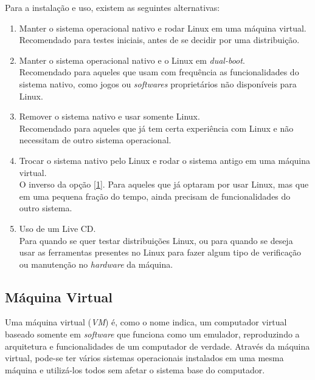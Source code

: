 \documentclass{handout_utfpr}
\begin{document}
Para a instalação e uso, existem as seguintes alternativas:

\begin{enumerate}
\item \label{1}Manter o sistema operacional nativo e rodar Linux em uma máquina virtual.\\
  Recomendado para testes iniciais, antes de se decidir por uma distribuição.

\item Manter o sistema operacional nativo e o Linux em \textit{dual-boot}.\\
  Recomendado para aqueles que usam com frequência as funcionalidades do sistema nativo, como jogos ou \textit{softwares} proprietários não disponíveis para Linux.

\item Remover o sistema nativo e usar somente Linux.\\
  Recomendado para aqueles que já tem certa experiência com Linux e não necessitam de outro sistema operacional.

\item Trocar o sistema nativo pelo Linux e rodar o sistema antigo em uma máquina virtual.\\
  O inverso da opção \ref{1}. Para aqueles que já optaram por usar Linux, mas que em uma pequena fração do tempo, ainda precisam de funcionalidades do outro sistema.
  
\item Uso de um Live CD.\\
  Para quando se quer testar distribuições Linux, ou para quando se deseja usar as ferramentas presentes no Linux para fazer algum tipo de verificação ou manutenção no \textit{hardware} da máquina.
\end{enumerate}

\subsection{Máquina Virtual}

Uma máquina virtual (\emph{VM}) é, como o nome indica, um computador virtual baseado somente em \emph{software} que funciona como um emulador, reproduzindo a arquitetura e funcionalidades de um computador de verdade. Através da máquina virtual, pode-se ter vários sistemas operacionais instalados em uma mesma máquina e utilizá-los todos sem afetar o sistema base do computador.
\end{document}
